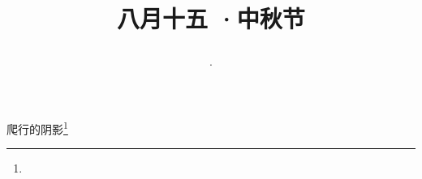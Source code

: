 \title{\date[d=17,m=9,y=2024][year:cn-y,年,month:cn,day:cn,日,·,weekday]·八月十五 ·中秋节}
爬行的阴影\footnote{ }

